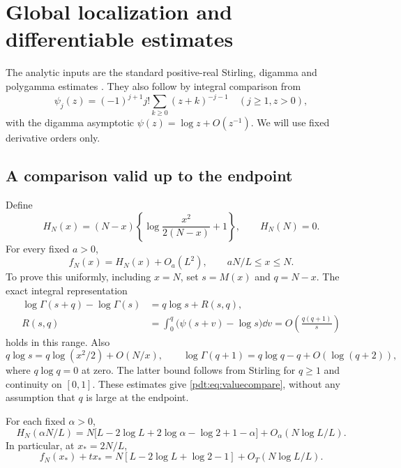 \section{Global localization and differentiable estimates}
\label{pdt:sec:localization}
The analytic inputs are the standard positive-real Stirling, digamma and polygamma estimates \cite{dlmf}. They also follow by integral comparison from
\[
 \psi_j(z)=(-1)^{j+1}j!\sum_{k\ge0}(z+k)^{-j-1}\quad(j\ge1,z>0),
\]
with the digamma asymptotic $\psi(z)=\log z+O(z^{-1})$. We will use fixed derivative orders only.

\subsection{A comparison valid up to the endpoint}
Define
\begin{equation}\label{pdt:eq:Hphase}
 H_N(x)=(N-x)\left\{\log\frac{x^2}{2(N-x)}+1\right\},
 \qquad H_N(N)=0.
\end{equation}
For every fixed $a>0$,
\begin{equation}\label{pdt:eq:valuecompare}
 f_N(x)=H_N(x)+O_a(L^2),\qquad aN/L\le x\le N.
\end{equation}
To prove this uniformly, including $x=N$, set $s=M(x)$ and $q=N-x$. The exact integral representation
\begin{align}
 \log\Gamma(s+q)-\log\Gamma(s)&=q\log s+R(s,q),\label{pdt:eq:remainder}\\
 R(s,q)&=\int_0^q\bigl(\psi(s+v)-\log s\bigr)\dd v
       =O\!\left(\frac{q(q+1)}s\right)\label{pdt:eq:Rbound}
\end{align}
holds in this range. Also
\[
 q\log s=q\log(x^2/2)+O(N/x),\qquad
 \log\Gamma(q+1)=q\log q-q+O(\log(q+2)),
\]
where $q\log q=0$ at zero. The latter bound follows from Stirling for $q\ge1$ and continuity on $[0,1]$. These estimates give \eqref{pdt:eq:valuecompare}, without any assumption that $q$ is large at the endpoint.

For each fixed $\alpha>0$,
\begin{equation}\label{pdt:eq:fixedalpha}
 H_N(\alpha N/L)=N\bigl[L-2\log L+2\log\alpha-\log2+1-\alpha\bigr]
        +O_\alpha(N\log L/L).
\end{equation}
In particular, at $x_*=2N/L$,
\[
 f_N(x_*)+tx_*=N[L-2\log L+\log2-1]+O_T(N\log L/L).
\]

